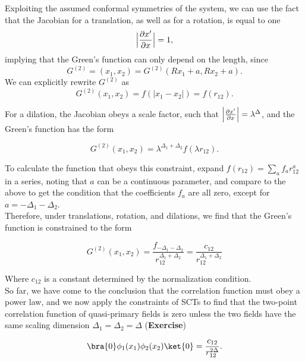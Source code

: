 \noindent Exploiting the assumed conformal symmetries of the system, we can use the fact that the Jacobian for a translation, as well as for a rotation, is equal to one $$\Big{|} \frac{\partial x'}{\partial x} \Big{|} = 1,$$ implying that the Green's function can only depend on the length, since 
\begin{equation}
	G^{(2)}=(x_1,x_2) = G^{(2)}(Rx_1 + a, Rx_2 + a).
\end{equation}
We can explicitly rewrite $G^{(2)}$ as
\begin{equation}
G^{(2)} (x_1, x_2) = f(|x_1 - x_2|) = f(r_{12}).
\end{equation}

\noindent For a dilation, the Jacobian obeys a scale factor, such that $\Big{|} \frac{\partial x'}{\partial x} \Big{|} = \lambda^{\Delta}$, and the Green's function has the form

\begin{equation}
G^{(2)} (x_1, x_2) = \lambda^{\Delta_1 + \Delta_2} f(\lambda r_{12}).
\end{equation}

\noindent To calculate the function that obeys this constraint, expand $f(r_{12}) = \sum_a f_a r_{12}^a$ in a series, noting that $a$ can be a continuous parameter, and compare to the above to get the condition that the coefficients $f_a$ are all zero, except for $a = -\Delta_1 - \Delta_2$. \\

\noindent Therefore, under translations, rotation, and dilations, we find that the Green's function is constrained to the form

\begin{equation}
G^{(2)} (x_1, x_2) = \frac{f_{-\Delta_1 - \Delta_2}}{r_{12}^{\Delta_1 + \Delta_2}} = \frac{c_{12}}{r_{12}^{\Delta_1 + \Delta_2}}
\end{equation}

\noindent Where $c_{12}$ is a constant determined by the normalization condition. \\

\noindent So far, we have come to the conclusion that the correlation function must obey a power law, and we now apply the constraints of SCTs to find that the two-point correlation function of quasi-primary fields is zero unless the two fields have the same scaling dimension $\Delta_1 = \Delta_2 = \Delta$ (\textbf{Exercise})

\begin{equation}
\bra{0} \phi_1 (x_1) \phi_2 (x_2) \ket{0} = \frac{c_{12}}{r_{12}^{2\Delta}}.
\end{equation}

